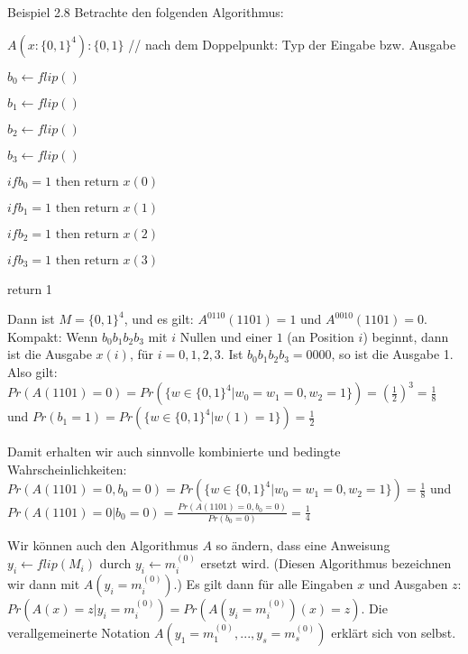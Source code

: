 \documentclass[a4paper]{article}
\begin{document}
\begin{multicols}{3}
    Beispiel 2.8 Betrachte den folgenden Algorithmus:
    \begin{itemize*}
        \item $A(x:\{0,1\}^4):\{0,1\}$    // nach dem Doppelpunkt: Typ der Eingabe bzw. Ausgabe
        \item $b_0 \leftarrow flip()$
        \item $b_1 \leftarrow flip()$
        \item $b_2 \leftarrow flip()$
        \item $b_3 \leftarrow flip()$
        \item $if b_0 = 1 \text{ then return } x(0)$
        \item $if b_1 = 1 \text{ then return } x(1)$
        \item $if b_2 = 1 \text{ then return } x(2)$
        \item $if b_3 = 1 \text{ then return } x(3)$
        \item return 1
    \end{itemize*}

    Dann ist $M=\{0,1\}^4$, und es gilt: $A^{0110}(1101)=1$ und $A^{0010}(1101)=0$. Kompakt: Wenn $b_0 b_1 b_2 b_3$ mit $i$ Nullen und einer $1$ (an Position $i$) beginnt, dann ist die Ausgabe $x(i)$, für $i=0,1,2,3$. Ist $b_0 b_1 b_2 b_3=0000$, so ist die Ausgabe 1. Also gilt: $Pr(A(1101)=0) = Pr(\{w\in\{0,1\}^4 |w_0=w_1=0, w_2=1\}) =(\frac{1}{2})^3 =\frac{1}{8}$ und $Pr(b_1=1) =Pr(\{w\in\{0,1\}^4 |w(1)=1\})=\frac{1}{2}$

    Damit erhalten wir auch sinnvolle kombinierte und bedingte Wahrscheinlichkeiten: $Pr(A(1101)=0, b_0=0)= Pr(\{w\in\{0,1\}^4 |w_0=w_1=0, w_2=1\}) =\frac{1}{8}$ und $Pr(A(1101)=0| b_0=0) =\frac{Pr(A(1101)=0, b_0=0)}{Pr(b_0=0)}=\frac{1}{4}$

    Wir können auch den Algorithmus $A$ so ändern, dass eine Anweisung $y_i\leftarrow flip(M_i)$ durch $y_i\leftarrow m^{(0)}_i$ ersetzt wird. (Diesen Algorithmus bezeichnen wir dann mit $A(y_i=m^{(0)}_i)$.) Es gilt dann für alle Eingaben $x$ und Ausgaben $z$: $Pr(A(x)=z| y_i=m^{(0)}_i) =Pr(A(y_i=m^{(0)}_i)(x) =z)$. Die verallgemeinerte Notation $A(y_1=m^{(0)}_1,...,y_s=m^{(0)}_s)$ erklärt sich von selbst.


\end{multicols}
\end{document}
